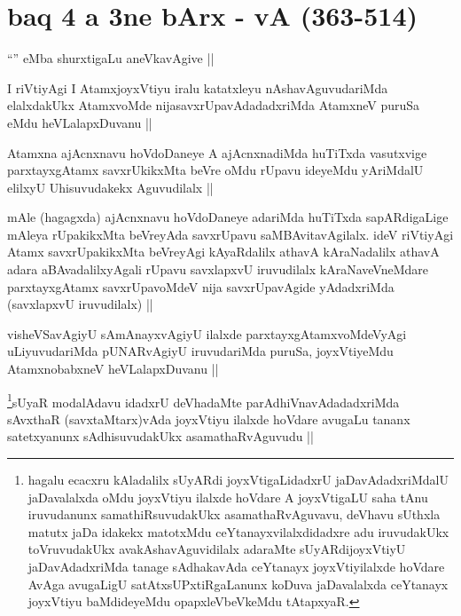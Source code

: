 \section*{baq 4 a 3ne  bArx - vA (363-514)}

\begin{artha}
``\stext'' eMba shurxtigaLu aneVkavAgive ||
\end{artha}

\begin{artha}
I riVtiyAgi I AtamxjoyxVtiyu iralu katatxleyu nAshavAguvudariMda elalxdakUkx AtamxvoMde nijasavxrUpavAdadadxriMda AtamxneV puruSa eMdu heVLalapxDuvanu ||
\end{artha}

\begin{artha}
Atamxna ajAcnxnavu hoVdoDaneye A ajAcnxnadiMda huTiTxda vasutxvige parxtayxgAtamx savxrUkikxMta beVre oMdu rUpavu ideyeMdu yAriMdalU elilxyU Uhisuvudakekx Aguvudilalx || 
\end{artha}

\begin{artha}
mAle (hagagxda) ajAcnxnavu hoVdoDaneye adariMda huTiTxda sapARdigaLige mAleya rUpakikxMta beVreyAda savxrUpavu saMBAvitavAgilalx. ideV riVtiyAgi Atamx savxrUpakikxMta beVreyAgi kAyaRdalilx athavA kAraNadalilx athavA adara aBAvadalilxyAgali rUpavu savxlapxvU iruvudilalx kAraNaveVneMdare parxtayxgAtamx savxrUpavoMdeV nija savxrUpavAgide yAdadxriMda (savxlapxvU iruvudilalx) ||
\end{artha}

\begin{artha}
visheVSavAgiyU sAmAnayxvAgiyU ilalxde parxtayxgAtamxvoMdeVyAgi uLiyuvudariMda pUNARvAgiyU iruvudariMda puruSa, joyxVtiyeMdu AtamxnobabxneV heVLalapxDuvanu ||
\end{artha}

\begin{artha}
\footnote{hagalu ecacxru kAladalilx sUyARdi joyxVtigaLidadxrU jaDavAdadxriMdalU jaDavalalxda oMdu joyxVtiyu ilalxde hoVdare A joyxVtigaLU saha tAnu iruvudanunx samathiRsuvudakUkx asamathaRvAguvavu, deVhavu sUthxla matutx jaDa idakekx matotxMdu ceYtanayxvilalxdidadxre adu iruvudakUkx toVruvudakUkx avakAshavAguvidilalx adaraMte sUyARdijoyxVtiyU jaDavAdadxriMda tanage sAdhakavAda ceYtanayx joyxVtiyilalxde hoVdare AvAga avugaLigU satAtxsUPxtiRgaLanunx koDuva jaDavalalxda ceYtanayx joyxVtiyu baMdideyeMdu opapxleVbeVkeMdu tAtapxyaR.}sUyaR modalAdavu idadxrU deVhadaMte parAdhiVnavAdadadxriMda sAvxthaR (savxtaMtarx)vAda joyxVtiyu ilalxde hoVdare avugaLu tananx satetxyanunx sAdhisuvudakUkx asamathaRvAguvudu ||
\end{artha}

